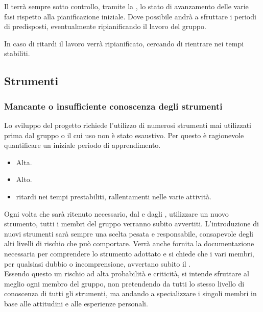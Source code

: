 \documentclass[a4paper, titlepage]{article}
\begin{document}
	Il  terrà sempre sotto controllo, tramite la , lo stato di avanzamento delle varie fasi rispetto alla pianificazione iniziale. Dove possibile andrà a sfruttare i periodi di  predisposti, eventualmente ripianificando il lavoro del gruppo.
	
	In caso di ritardi il lavoro verrà ripianificato, cercando di rientrare nei tempi stabiliti.
	
	\subsection{Strumenti}
	\subsubsection{Mancante o insufficiente conoscenza degli strumenti}
	Lo sviluppo del progetto richiede l'utilizzo di numerosi strumenti mai utilizzati prima dal gruppo o il cui uso non è stato esaustivo. Per questo è ragionevole quantificare un iniziale periodo di apprendimento.
	
	\begin{itemize}
		\item {} Alta.
		\item {} Alto.
		\item {} ritardi nei tempi prestabiliti, rallentamenti nelle varie attività.
	\end{itemize}
	
	Ogni volta che sarà ritenuto necessario, dal  e dagli , utilizzare un nuovo strumento, tutti i membri del gruppo verranno subito avvertiti. L'introduzione di nuovi strumenti sarà sempre una scelta pesata e responsabile, consapevole degli alti livelli di rischio che può comportare. Verrà anche fornita la documentazione necessaria per comprendere lo strumento adottato e si chiede che i vari membri, per qualsiasi dubbio o incomprensione, avvertano subito il .\\
	Essendo questo un rischio ad alta probabilità e criticità, si intende sfruttare al meglio ogni membro del gruppo, non pretendendo da tutti lo stesso livello di conoscenza di tutti gli strumenti, ma andando a specializzare i singoli membri in base alle attitudini e alle esperienze personali.
	
\end{document}
